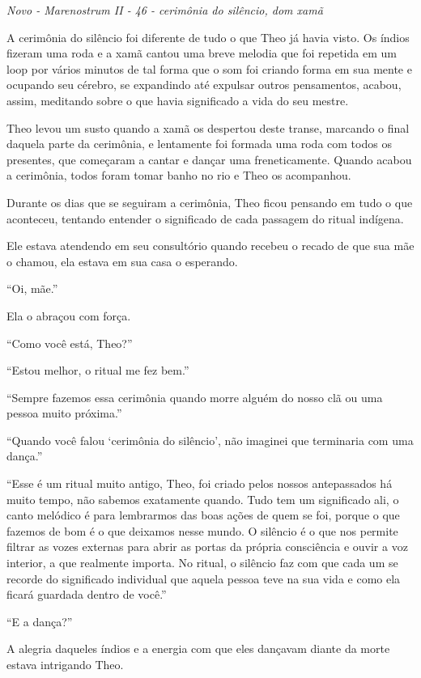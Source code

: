 \asterisc

\emph{Novo - Marenostrum II - 46 - cerimônia do silêncio, dom xamã}

A cerimônia do silêncio foi diferente de tudo o que Theo já havia visto.
Os índios fizeram uma roda e a xamã cantou uma breve melodia que foi
repetida em um loop por vários minutos de tal forma que o som foi
criando forma em sua mente e ocupando seu cérebro, se expandindo até
expulsar outros pensamentos, acabou, assim, meditando sobre o que havia
significado a vida do seu mestre.

Theo levou um susto quando a xamã os despertou deste transe, marcando o
final daquela parte da cerimônia, e lentamente foi formada uma roda com
todos os presentes, que começaram a cantar e dançar uma freneticamente.
Quando acabou a cerimônia, todos foram tomar banho no rio e Theo os
acompanhou.

Durante os dias que se seguiram a cerimônia, Theo ficou pensando em tudo
o que aconteceu, tentando entender o significado de cada passagem do
ritual indígena.

Ele estava atendendo em seu consultório quando recebeu o recado de que
sua mãe o chamou, ela estava em sua casa o esperando.

``Oi, mãe.''

Ela o abraçou com força.

``Como você está, Theo?''

``Estou melhor, o ritual me fez bem.''

``Sempre fazemos essa cerimônia quando morre alguém do nosso clã ou uma
pessoa muito próxima.''

``Quando você falou `cerimônia do silêncio', não imaginei que terminaria
com uma dança.''

``Esse é um ritual muito antigo, Theo, foi criado pelos nossos
antepassados há muito tempo, não sabemos exatamente quando. Tudo tem um
significado ali, o canto melódico é para lembrarmos das boas ações de
quem se foi, porque o que fazemos de bom é o que deixamos nesse mundo. O
silêncio é o que nos permite filtrar as vozes externas para abrir as
portas da própria consciência e ouvir a voz interior, a que realmente
importa. No ritual, o silêncio faz com que cada um se recorde do
significado individual que aquela pessoa teve na sua vida e como ela
ficará guardada dentro de você.''

``E a dança?''

A alegria daqueles índios e a energia com que eles dançavam diante da
morte estava intrigando Theo.


